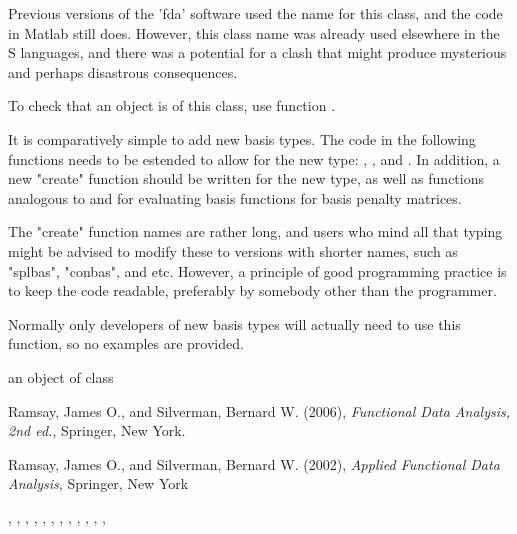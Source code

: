 \begin{Details}\relax
Previous versions of the 'fda' software used the name 
for this class, and the code in Matlab still does.  However, this
class name was already used elsewhere in the S languages, and there
was a potential for a clash that might produce mysterious and perhaps
disastrous consequences.

To check that an object is of this class, use function
.

It is comparatively simple to add new basis types.  The code in
the following functions needs to be estended to allow for the new
type: , ,
 and .
In addition, a new "create" function should be written for the
new type, as well as functions analogous to  and
 for evaluating basis functions for basis
penalty matrices.

The "create" function names are rather long, and users who mind
all that typing might be advised to modify these to versions with
shorter names, such as "splbas", "conbas", and etc.  However, a
principle of good programming practice is to keep the code readable,
preferably by somebody other than the programmer.

Normally only developers of new basis types will actually need
to use this function, so no examples are provided.
\end{Details}
\begin{Value}
an object of class 
\end{Value}
\begin{Source}\relax
Ramsay, James O., and Silverman, Bernard W. (2006), \emph{Functional
Data Analysis, 2nd ed.}, Springer, New York.

Ramsay, James O., and Silverman, Bernard W. (2002), \emph{Applied
Functional Data Analysis}, Springer, New York
\end{Source}
\begin{SeeAlso}\relax
{}, 
, 
, 
, 
, 
, 
, 
, 
, 
, 
, 
, 
\end{SeeAlso}

